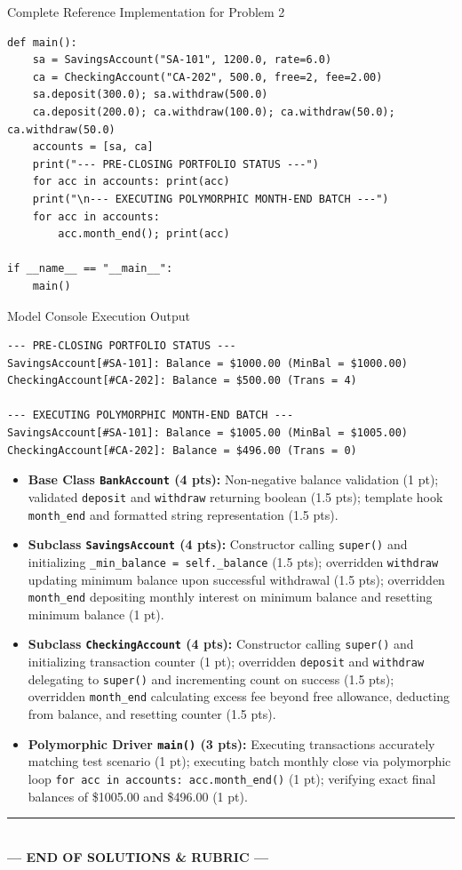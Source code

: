 \documentclass[11pt,a4paper]{article}
\begin{document}
\begin{solbox}{Complete Reference Implementation for Problem 2}
\begin{lstlisting}
def main():
    sa = SavingsAccount("SA-101", 1200.0, rate=6.0)
    ca = CheckingAccount("CA-202", 500.0, free=2, fee=2.00)
    sa.deposit(300.0); sa.withdraw(500.0)
    ca.deposit(200.0); ca.withdraw(100.0); ca.withdraw(50.0); ca.withdraw(50.0)
    accounts = [sa, ca]
    print("--- PRE-CLOSING PORTFOLIO STATUS ---")
    for acc in accounts: print(acc)
    print("\n--- EXECUTING POLYMORPHIC MONTH-END BATCH ---")
    for acc in accounts:
        acc.month_end(); print(acc)

if __name__ == "__main__":
    main()
\end{lstlisting}
\end{solbox}

\newpage
\begin{solbox}{Model Console Execution Output}
\begin{verbatim}
--- PRE-CLOSING PORTFOLIO STATUS ---
SavingsAccount[#SA-101]: Balance = $1000.00 (MinBal = $1000.00)
CheckingAccount[#CA-202]: Balance = $500.00 (Trans = 4)

--- EXECUTING POLYMORPHIC MONTH-END BATCH ---
SavingsAccount[#SA-101]: Balance = $1005.00 (MinBal = $1005.00)
CheckingAccount[#CA-202]: Balance = $496.00 (Trans = 0)
\end{verbatim}
\end{solbox}

\begin{rubricbox}
\begin{itemize}[leftmargin=1.5em,itemsep=2.0pt]
\item \textbf{Base Class \texttt{BankAccount} (4 pts):} Non-negative balance validation (1 pt); validated \texttt{deposit} and \texttt{withdraw} returning boolean (1.5 pts); template hook \texttt{month\_end} and formatted string representation (1.5 pts).
\item \textbf{Subclass \texttt{SavingsAccount} (4 pts):} Constructor calling \texttt{super()} and initializing \texttt{\_min\_balance = self.\_balance} (1.5 pts); overridden \texttt{withdraw} updating minimum balance upon successful withdrawal (1.5 pts); overridden \texttt{month\_end} depositing monthly interest on minimum balance and resetting minimum balance (1 pt).
\item \textbf{Subclass \texttt{CheckingAccount} (4 pts):} Constructor calling \texttt{super()} and initializing transaction counter (1 pt); overridden \texttt{deposit} and \texttt{withdraw} delegating to \texttt{super()} and incrementing count on success (1.5 pts); overridden \texttt{month\_end} calculating excess fee beyond free allowance, deducting from balance, and resetting counter (1.5 pts).
\item \textbf{Polymorphic Driver \texttt{main()} (3 pts):} Executing transactions accurately matching test scenario (1 pt); executing batch monthly close via polymorphic loop \texttt{for acc in accounts: acc.month\_end()} (1 pt); verifying exact final balances of \$1005.00 and \$496.00 (1 pt).
\end{itemize}
\end{rubricbox}

\vfill
\begin{center}\rule{0.5\textwidth}{0.4pt}\\[1mm]
\textbf{\color{primaryblue}--- END OF SOLUTIONS \& RUBRIC ---}
\end{center}
\end{document}
